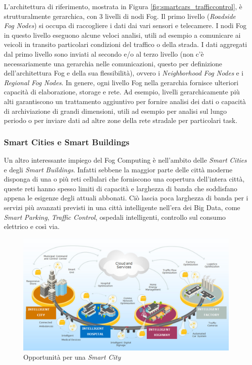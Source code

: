L'architettura di riferimento, mostrata in Figura \ref{fig:smartcars_trafficcontrol}, è strutturalmente gerarchica, con 3 livelli di nodi Fog. Il primo livello (\textit{Roadside Fog Nodes}) si occupa di raccogliere i dati dai vari sensori e telecamere. I nodi Fog in questo livello eseguono alcune veloci analisi, utili ad esempio a comunicare ai veicoli in transito particolari condizioni del traffico o della strada. I dati aggregati dal primo livello sono inviati al secondo e/o al terzo livello (non c'è necessariamente una gerarchia nelle comunicazioni, questo per definizione dell'architettura Fog e della sua flessibilità), ovvero i \textit{Neighborhood Fog Nodes} e i \textit{Regional Fog Nodes}. In genere, ogni livello Fog nella gerarchia fornisce ulteriori capacità di elaborazione, storage e rete. Ad esempio, livelli gerarchicamente più alti garantiscono un trattamento aggiuntivo per fornire analisi dei dati o capacità di archiviazione di grandi dimensioni, utili ad esempio per analisi sul lungo periodo o per inviare dati ad altre zone della rete stradale per particolari task.

\subsubsection{Smart Cities e Smart Buildings}

Un altro interessante impiego del Fog Computing è nell'ambito delle \textit{Smart Cities} e degli \textit{Smart Buildings}. Infatti sebbene  la maggior parte delle città moderne disponga di una o più reti cellulari che forniscono una copertura dell'intera città, queste reti hanno spesso limiti di capacità e larghezza di banda che soddisfano appena le esigenze degli attuali abbonati. Ciò lascia poca larghezza di banda per i servizi più avanzati previsti in una città intelligente nell'era dei Big Data, come \textit{Smart Parking}, \textit{Traffic Control}, ospedali intelligenti, controllo sul consumo elettrico e così via.  

\begin{figure}[!ht]
  \includegraphics[width=14cm]{images/smartcities_smartbuildings}
  \centering
  \caption[Opportunità per una Smart City]{Opportunità per una \textit{Smart City} \cite{OpenFogReferenceArchitecture}}
  \label{fig:smartcities_smartbuildings}
\end{figure}


